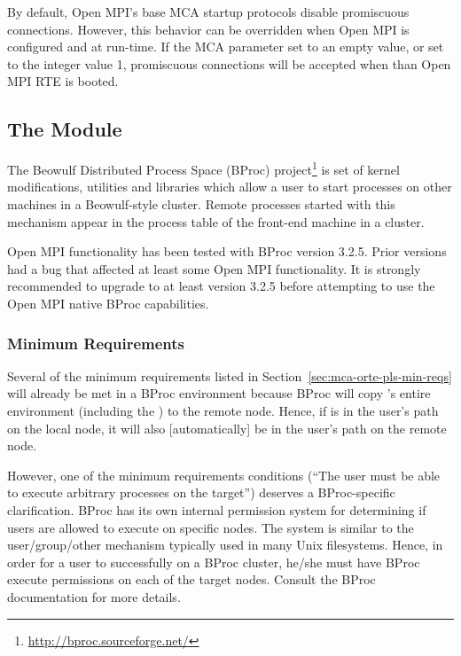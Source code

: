 By default, Open MPI's base  MCA startup protocols disable
promiscuous connections.  However, this behavior can be overridden
when Open MPI is configured and at run-time.  If the MCA parameter
 set to an empty value, or set to
the integer value 1, promiscuous connections will be accepted when
than Open MPI RTE is booted.


\subsection{The  Module}

The Beowulf Distributed Process Space (BProc)
project\footnote{\url{http://bproc.sourceforge.net/}} is set of kernel
modifications, utilities and libraries which allow a user to start
processes on other machines in a Beowulf-style cluster.  Remote
processes started with this mechanism appear in the process table of
the front-end machine in a cluster.

Open MPI functionality has been tested with BProc version 3.2.5.  Prior
versions had a bug that affected at least some Open MPI functionality.
It is strongly recommended to upgrade to at least version 3.2.5 before
attempting to use the Open MPI native BProc capabilities.


\subsubsection{Minimum Requirements}

Several of the minimum requirements listed in
Section~\ref{sec:mca-orte-pls-min-reqs} will already be met in a BProc
environment because BProc will copy 's entire environment
(including the ) to the remote node.  Hence, if
 is in the user's path on the local node, it will also
[automatically] be in the user's path on the remote node.

However, one of the minimum requirements conditions (``The user must
be able to execute arbitrary processes on the target'') deserves a
BProc-specific clarification.  BProc has its own internal permission
system for determining if users are allowed to execute on specific
nodes.  The system is similar to the user/group/other mechanism
typically used in many Unix filesystems.  Hence, in order for a user
to successfully  on a BProc cluster, he/she must have
BProc execute permissions on each of the target nodes.  Consult the
BProc documentation for more details.

